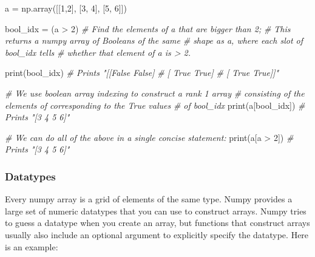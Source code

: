 \documentclass[
]{article}
\newenvironment{Shaded}{}{}
\newcommand{\BuiltInTok}[1]{#1}
\newcommand{\CommentTok}[1]{\textcolor[rgb]{0.38,0.63,0.69}{\textit{#1}}}
\newcommand{\DecValTok}[1]{\textcolor[rgb]{0.25,0.63,0.44}{#1}}
\newcommand{\NormalTok}[1]{#1}
\newcommand{\OperatorTok}[1]{\textcolor[rgb]{0.40,0.40,0.40}{#1}}
\begin{document}
\begin{Shaded}
\begin{Highlighting}[]
\NormalTok{a }\OperatorTok{=}\NormalTok{ np.array([[}\DecValTok{1}\NormalTok{,}\DecValTok{2}\NormalTok{], [}\DecValTok{3}\NormalTok{, }\DecValTok{4}\NormalTok{], [}\DecValTok{5}\NormalTok{, }\DecValTok{6}\NormalTok{]])}

\NormalTok{bool\_idx }\OperatorTok{=}\NormalTok{ (a }\OperatorTok{\textgreater{}} \DecValTok{2}\NormalTok{)   }\CommentTok{\# Find the elements of a that are bigger than 2;}
                     \CommentTok{\# This returns a numpy array of Booleans of the same}
                     \CommentTok{\# shape as a, where each slot of bool\_idx tells}
                     \CommentTok{\# whether that element of a is \textgreater{} 2.}

\BuiltInTok{print}\NormalTok{(bool\_idx)      }\CommentTok{\# Prints "[[False False]}
                     \CommentTok{\#          [ True  True]}
                     \CommentTok{\#          [ True  True]]"}

\CommentTok{\# We use boolean array indexing to construct a rank 1 array}
\CommentTok{\# consisting of the elements of corresponding to the True values}
\CommentTok{\# of bool\_idx}
\BuiltInTok{print}\NormalTok{(a[bool\_idx])  }\CommentTok{\# Prints "[3 4 5 6]"}

\CommentTok{\# We can do all of the above in a single concise statement:}
\BuiltInTok{print}\NormalTok{(a[a }\OperatorTok{\textgreater{}} \DecValTok{2}\NormalTok{])     }\CommentTok{\# Prints "[3 4 5 6]"}
\end{Highlighting}
\end{Shaded}

\hypertarget{datatypes}{%
\subsubsection{Datatypes}\label{datatypes}}

Every numpy array is a grid of elements of the same type. Numpy provides
a large set of numeric datatypes that you can use to construct arrays.
Numpy tries to guess a datatype when you create an array, but functions
that construct arrays usually also include an optional argument to
explicitly specify the datatype. Here is an example:
\end{document}
